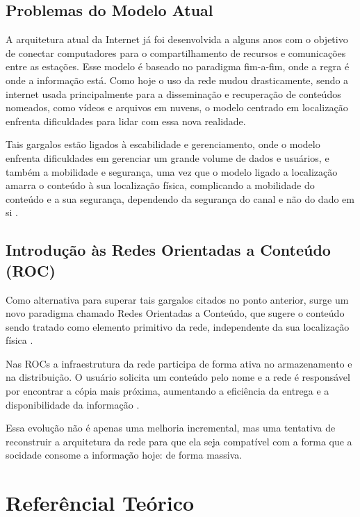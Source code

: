 \documentclass[12pt]{article}
\begin{document}
\subsection{Problemas do Modelo Atual}

A arquitetura atual da Internet já foi desenvolvida a alguns anos com o objetivo de conectar computadores para o compartilhamento de recursos e comunicações entre as estações. Esse modelo é baseado no paradigma fim-a-fim, onde a regra é onde a informação está. 
Como hoje o uso da rede mudou drasticamente, sendo a internet usada principalmente para a disseminação e recuperação de conteúdos nomeados, como vídeos e arquivos em nuvens, o modelo centrado em localização enfrenta dificuldades para lidar com essa nova realidade.

Tais gargalos estão ligados à escabilidade e gerenciamento, onde o modelo enfrenta dificuldades em gerenciar um grande volume de dados e usuários, e também a mobilidade e segurança, uma vez que o modelo ligado a localização amarra o conteúdo à sua localização física, complicando a mobilidade do conteúdo e a sua segurança, dependendo da segurança do canal e não do dado em si \cite{ambiel2013redes}.

\subsection{Introdução às Redes Orientadas a Conteúdo (ROC)}

Como alternativa para superar tais gargalos citados no ponto anterior, surge um novo paradigma chamado Redes Orientadas a Conteúdo, que sugere o conteúdo sendo tratado como elemento primitivo da rede, independente da sua localização física \cite{ambiel2013redes}.

Nas ROCs a infraestrutura da rede participa de forma ativa no armazenamento e na distribuição. O usuário solicita um conteúdo pelo nome e a rede é responsável por encontrar a cópia mais próxima, aumentando a eficiência da entrega e a disponibilidade da informação \cite{brito2012redes}.

Essa evolução não é apenas uma melhoria incremental, mas uma tentativa de reconstruir a arquitetura da rede para que ela seja compatível com a forma que a socidade consome a informação hoje: de forma massiva.

\section{Referêncial Teórico}
\end{document}
